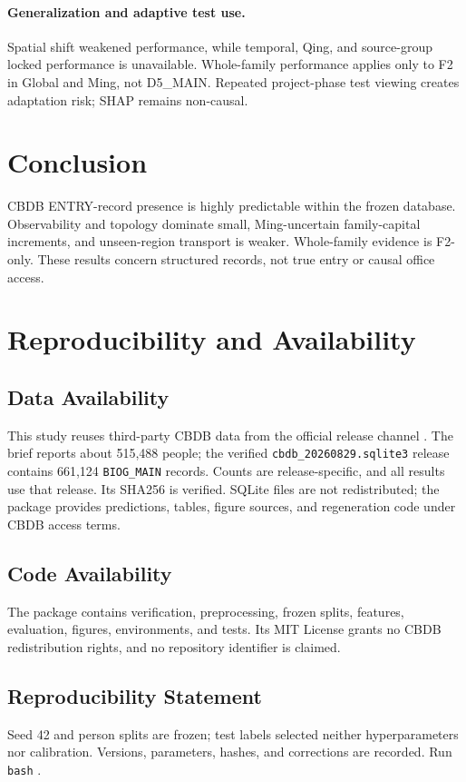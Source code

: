 \documentclass[sigconf]{acmart}
\begin{document}
\paragraph{Generalization and adaptive test use.}
Spatial shift weakened performance, while temporal, Qing, and source-group locked performance is unavailable. Whole-family performance applies only to F2 in Global and Ming, not D5\_MAIN. Repeated project-phase test viewing creates adaptation risk; SHAP remains non-causal.

\section{Conclusion}
CBDB ENTRY-record presence is highly predictable within the frozen database. Observability and topology dominate small, Ming-uncertain family-capital increments, and unseen-region transport is weaker. Whole-family evidence is F2-only. These results concern structured records, not true entry or causal office access.

\section{Reproducibility and Availability}
\subsection{Data Availability}
This study reuses third-party CBDB data from the official release channel \cite{cbdb2026,fuller2024}. The brief reports about 515,488 people; the verified \texttt{cbdb\_20260829.sqlite3} release contains 661,124 \texttt{BIOG\_MAIN} records. Counts are release-specific, and all results use that release. Its SHA256 is verified. SQLite files are not redistributed; the package provides predictions, tables, figure sources, and regeneration code under CBDB access terms.

\subsection{Code Availability}
The package contains verification, preprocessing, frozen splits, features, evaluation, figures, environments, and tests. Its MIT License grants no CBDB redistribution rights, and no repository identifier is claimed.

\subsection{Reproducibility Statement}
Seed 42 and person splits are frozen; test labels selected neither hyperparameters nor calibration. Versions, parameters, hashes, and corrections are recorded. Run \texttt{bash} .
\end{document}
